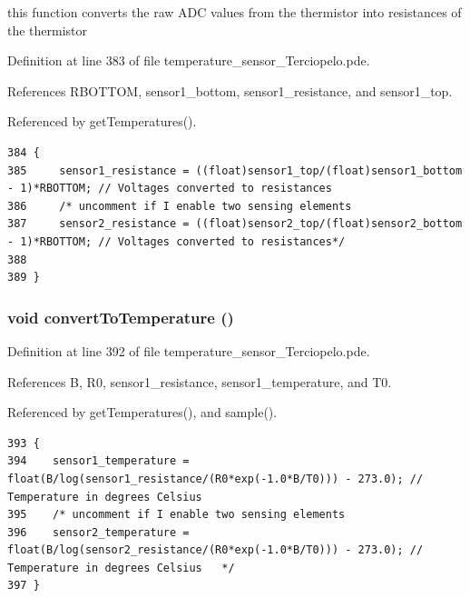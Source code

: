 this function converts the raw ADC values from the thermistor into resistances of the thermistor 



Definition at line 383 of file temperature\_\-sensor\_\-Terciopelo.pde.

References RBOTTOM, sensor1\_\-bottom, sensor1\_\-resistance, and sensor1\_\-top.

Referenced by getTemperatures().

\begin{Code}\begin{verbatim}384 {
385     sensor1_resistance = ((float)sensor1_top/(float)sensor1_bottom - 1)*RBOTTOM; // Voltages converted to resistances
386     /* uncomment if I enable two sensing elements
387     sensor2_resistance = ((float)sensor2_top/(float)sensor2_bottom - 1)*RBOTTOM; // Voltages converted to resistances*/
388  
389 }
\end{verbatim}
\end{Code}


\hypertarget{temperature__sensor___terciopelo_8pde_3aa4f99331713009a70ee34eba83754b}{
\subsubsection[{convertToTemperature}]{\setlength{\rightskip}{0pt plus 5cm}void convertToTemperature ()}}
\label{temperature__sensor___terciopelo_8pde_3aa4f99331713009a70ee34eba83754b}




Definition at line 392 of file temperature\_\-sensor\_\-Terciopelo.pde.

References B, R0, sensor1\_\-resistance, sensor1\_\-temperature, and T0.

Referenced by getTemperatures(), and sample().

\begin{Code}\begin{verbatim}393 {
394    sensor1_temperature = float(B/log(sensor1_resistance/(R0*exp(-1.0*B/T0))) - 273.0); // Temperature in degrees Celsius
395    /* uncomment if I enable two sensing elements
396    sensor2_temperature = float(B/log(sensor2_resistance/(R0*exp(-1.0*B/T0))) - 273.0); // Temperature in degrees Celsius   */
397 }
\end{verbatim}
\end{Code}


